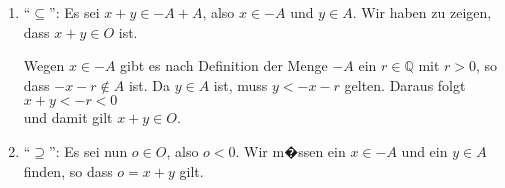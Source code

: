 \begin{enumerate}
\item ``$\subseteq$'':  Es sei $x + y \in -\!A + A$, also $x \in -\!A$ und $y \in A$.
      Wir haben zu zeigen, dass $x + y \in O$ ist.

      Wegen $x \in -\!A$ gibt es nach Definition der Menge $-\!A$ ein $r \in \mathbb{Q}$ mit $r > 0$, so dass 
      $-x - r \not\in A$ ist.  Da $y \in A$ ist, muss $y < -x - r$ gelten.  Daraus folgt
      \\[0.2cm]
      \hspace*{1.3cm}
      $x + y < -r < 0$
      \\[0.2cm]
      und damit gilt $x + y \in O$.

\item ``$\supseteq$'': Es sei nun $o \in O$, also $o < 0$.  Wir m�ssen ein $x \in -\!A$ und ein $y \in A$
      finden, so dass $o = x + y$ gilt.


\end{enumerate}
